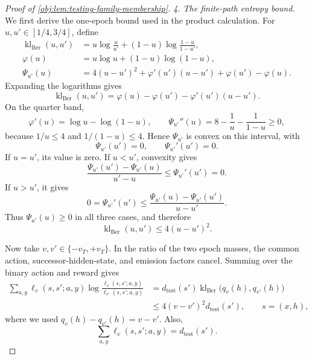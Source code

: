 \documentclass[11pt]{article}
\begin{document}
\begin{proof}[Proof of \cref{obj:lem:testing-family-membership}]
\emph{4. The finite-path entropy bound.}
We first derive the one-epoch bound used in the product calculation. For
\(u,u'\in[1/4,3/4]\), define
\[
\begin{aligned}
\operatorname{kl}_{\mathrm{Ber}}(u,u')
&=u\log\frac{u}{u'}
 +(1-u)\log\frac{1-u}{1-u'},\\
\varphi(u)&=u\log u+(1-u)\log(1-u),\\
\Psi_{u'}(u)
&=4(u-u')^2+\varphi'(u')(u-u')
  +\varphi(u')-\varphi(u).
\end{aligned}
\]
Expanding the logarithms gives
\[
\operatorname{kl}_{\mathrm{Ber}}(u,u')
=\varphi(u)-\varphi(u')-\varphi'(u')(u-u').
\]
On the quarter band,
\[
\varphi'(u)=\log u-\log(1-u),
\qquad
\Psi_{u'}''(u)=8-\frac1u-\frac1{1-u}\geq0,
\]
because \(1/u\leq4\) and \(1/(1-u)\leq4\). Hence \(\Psi_{u'}\) is convex on this interval, with
\[
\Psi_{u'}(u')=0,\qquad \Psi_{u'}'(u')=0.
\]
If \(u=u'\), its value is zero. If \(u<u'\), convexity gives
\[
\frac{\Psi_{u'}(u')-\Psi_{u'}(u)}{u'-u}
\leq\Psi_{u'}'(u')=0.
\]
If \(u>u'\), it gives
\[
0=\Psi_{u'}'(u')
\leq\frac{\Psi_{u'}(u)-\Psi_{u'}(u')}{u-u'}.
\]
Thus \(\Psi_{u'}(u)\geq0\) in all three cases, and therefore
\[
\operatorname{kl}_{\mathrm{Ber}}(u,u')
\leq4(u-u')^2.
\]

Now take \(v,v'\in\{-v_T,+v_T\}\). In the ratio of the two epoch masses, the common action, successor-hidden-state, and emission factors cancel. Summing over the binary action and reward gives
\[
\begin{aligned}
\sum_{a,y}\ell_v(s,s';a,y)
 \log\frac{\ell_v(s,s';a,y)}{\ell_{v'}(s,s';a,y)}
&=d_{\mathrm{test}}(s')
  \operatorname{kl}_{\mathrm{Ber}}\bigl(q_v(h),q_{v'}(h)\bigr)\\
&\leq4(v-v')^2d_{\mathrm{test}}(s'),
\qquad s=(x,h),
\end{aligned}
\]
where we used \(q_v(h)-q_{v'}(h)=v-v'\). Also,
\[
\sum_{a,y}\ell_v(s,s';a,y)=d_{\mathrm{test}}(s').
\]


\end{proof}
\end{document}
